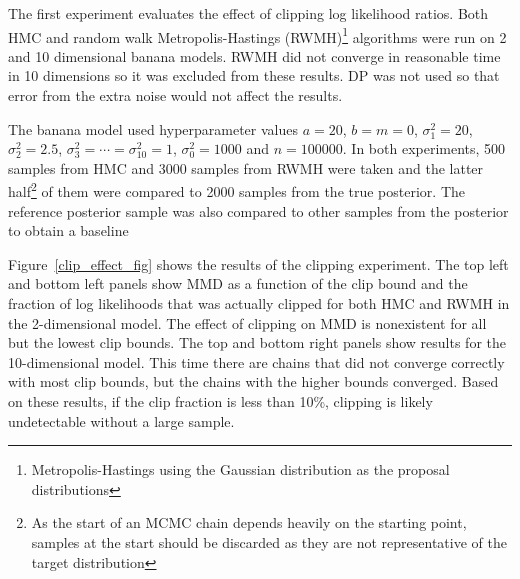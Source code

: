 \documentclass[english,twoside,openright]{HYgraduMLDS}
\begin{document}
The first experiment evaluates the effect of clipping log likelihood ratios.
Both HMC and random walk Metropolis-Hastings (RWMH)\footnote{Metropolis-Hastings using the Gaussian
distribution as the proposal distributions} 
algorithms were run on 2 and 10 dimensional banana models. RWMH did not 
converge in reasonable time in 10 dimensions so it was excluded from these results.
DP was not used so that error from the extra noise would not affect the results.

The banana model used hyperparameter values \(a = 20\), \(b = m = 0\), 
\(\sigma_1^2 = 20\), \(\sigma_2^2 = 2.5\), \(\sigma_3^2 = \dotsb = \sigma_{10}^2 = 1\),
\(\sigma_0^2 = 1000\) and \(n = 100000\).
In both experiments, 500 samples from HMC and 3000 samples from RWMH were taken
and the latter half\footnote{As the start of an MCMC chain depends heavily on the 
starting point, samples at the start should be discarded as they are not representative 
of the target distribution} of them were
compared to 2000 samples from the true posterior. The reference posterior sample 
was also compared to other samples from the posterior to obtain a baseline 

Figure~\ref{clip_effect_fig} shows the results of the clipping experiment.
The top left and bottom left panels show MMD as a function of the clip bound 
and the fraction of log likelihoods that was actually clipped for both 
HMC and RWMH in the 2-dimensional model. The effect of clipping on MMD 
is nonexistent for all but the lowest clip bounds. The top and bottom right 
panels show results for the 10-dimensional model. This time there are chains 
that did not converge correctly with most clip bounds, but the chains with 
the higher bounds converged. Based on these results, if the clip fraction is 
less than 10\%, clipping is likely undetectable without a large sample.
\end{document}

